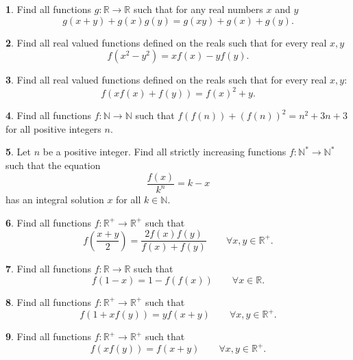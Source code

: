 \documentclass{article}
\theoremstyle{definition}
\newtheorem{p}{}
\begin{document}
\begin{p}
Find all functions $g:\mathbb R \to \mathbb R$ such that for any real numbers $x$ and $y$
\[g(x+y)+g(x)g(y)=g(xy)+g(x)+g(y).\]
\end{p}

\begin{p}
Find all real valued functions defined on the reals such that for every real $x,y$ 
\[f(x^2-y^2)=xf(x)-yf(y).\]
\end{p}



\begin{p}
Find all real valued functions defined on the reals such that for every real $x,y$:
\[f(xf(x)+f(y))=f(x)^2+y.\]
\end{p}



\begin{p}
Find all functions $f\colon \mathbb{N}\to\mathbb{N}$ such that $f(f(n))+(f(n))^2 =n^2 +3n+3$ for all positive integers $n$.
\end{p}



\begin{p}
Let $ n$ be a positive integer. Find all strictly increasing functions $ f: \mathbb{N}^* \to \mathbb{N}^*$ such that the equation
\[ \frac {f(x)}{k^n} = k - x\]
has an integral solution $ x$ for all $ k \in \mathbb{N}$.
\end{p}



\begin{p}
Find all functions $ f: \mathbb R^+ \to \mathbb R^+$ such that
\[ f (\frac{x+y}{2})=  \frac{2f(x)f(y)}{f(x)+f(y)} \qquad \forall x,y \in \mathbb R^+.\]
\end{p}



\begin{p}
Find all functions $ f: \mathbb R \to \mathbb R$ such that
\[ f(1 - x) = 1 - f(f(x)) \qquad \forall x \in \mathbb R.\]
\end{p}



\begin{p}
Find all functions $ f: \mathbb R^+ \to \mathbb R^+$ such that
\[ f(1+xf(y))=yf(x+y)  \qquad \forall x,y \in \mathbb R^+.\]
\end{p}



\begin{p}
Find all functions $ f: \mathbb R^+ \to \mathbb R^+$ such that
\[f(xf(y))=f(x+y)  \qquad \forall x,y \in \mathbb R^+.\]
\end{p}
\end{document}
